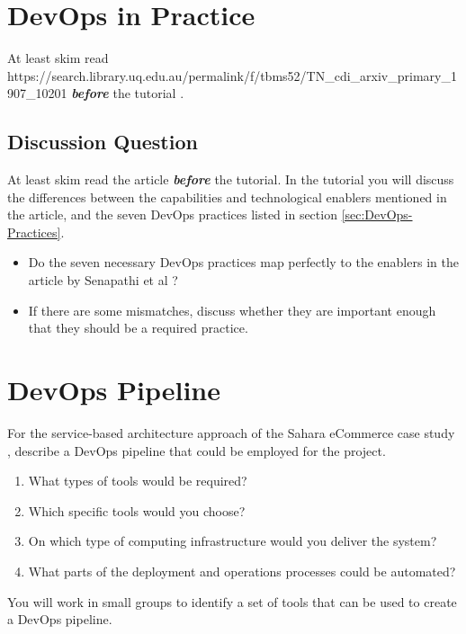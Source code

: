 \documentclass{csse4400}
\begin{document}


\section{DevOps in Practice}
At least skim read 
{https://search.library.uq.edu.au/permalink/f/tbms52/TN_cdi_arxiv_primary_1907_10201}
\textbf{\textit{before}} the tutorial \cite{SenapathiMali2018DCPa}.

\subsection{Discussion Question}
At least skim read the article \textit{\textbf{before}} the tutorial.
In the tutorial you will discuss the differences between the capabilities and technological enablers mentioned in the article,
and the seven DevOps practices listed in section \ref{sec:DevOps-Practices}.
\begin{itemize}
    \item Do the seven necessary DevOps practices map perfectly to the enablers in the article by Senapathi et al \cite{SenapathiMali2018DCPa}?
    \item If there are some mismatches, discuss whether they are important enough that they should be a required practice.
\end{itemize}


\section{DevOps Pipeline}
For the service-based architecture approach of the Sahara eCommerce case study \cite{service-based-slides},
describe a DevOps pipeline that could be employed for the project.
\begin{enumerate}
    \item What types of tools would be required?
    \item Which specific tools would you choose?
    \item On which type of computing infrastructure would you deliver the system?
    \item What parts of the deployment and operations processes could be automated?
\end{enumerate}

\noindent
You will work in small groups to identify a set of tools that can be used to create a DevOps pipeline.





\end{document}
